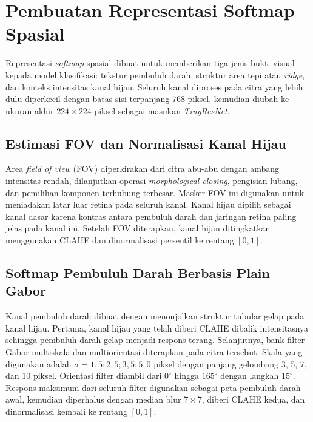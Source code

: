 \section{Pembuatan Representasi Softmap Spasial}

Representasi \textit{softmap} spasial dibuat untuk memberikan tiga jenis bukti visual kepada
model klasifikasi: tekstur pembuluh darah, struktur area tepi atau \textit{ridge}, dan konteks
intensitas kanal hijau. Seluruh kanal diproses pada citra yang lebih dulu diperkecil dengan
batas sisi terpanjang 768 piksel, kemudian diubah ke ukuran akhir $224 \times 224$ piksel
sebagai masukan \textit{TinyResNet}.

\subsection{Estimasi FOV dan Normalisasi Kanal Hijau}

Area \textit{field of view} (FOV) diperkirakan dari citra abu-abu dengan ambang intensitas
rendah, dilanjutkan operasi \textit{morphological closing}, pengisian lubang, dan pemilihan
komponen terhubung terbesar. Masker FOV ini digunakan untuk meniadakan latar luar retina
pada seluruh kanal. Kanal hijau dipilih sebagai kanal dasar karena kontras antara pembuluh
darah dan jaringan retina paling jelas pada kanal ini. Setelah FOV diterapkan, kanal hijau
ditingkatkan menggunakan CLAHE dan dinormalisasi persentil ke rentang $[0, 1]$.

\subsection{Softmap Pembuluh Darah Berbasis Plain Gabor}

Kanal pembuluh darah dibuat dengan menonjolkan struktur tubular gelap pada kanal hijau.
Pertama, kanal hijau yang telah diberi CLAHE dibalik intensitasnya sehingga pembuluh darah
gelap menjadi respons terang. Selanjutnya, bank filter Gabor multiskala dan multiorientasi
diterapkan pada citra tersebut. Skala yang digunakan adalah $\sigma = 1{,}5; 2{,}5; 3{,}5;
5{,}0$ piksel dengan panjang gelombang 3, 5, 7, dan 10 piksel. Orientasi filter diambil dari
$0^\circ$ hingga $165^\circ$ dengan langkah $15^\circ$. Respons maksimum dari seluruh filter
digunakan sebagai peta pembuluh darah awal, kemudian diperhalus dengan median blur $7 \times
7$, diberi CLAHE kedua, dan dinormalisasi kembali ke rentang $[0, 1]$.

